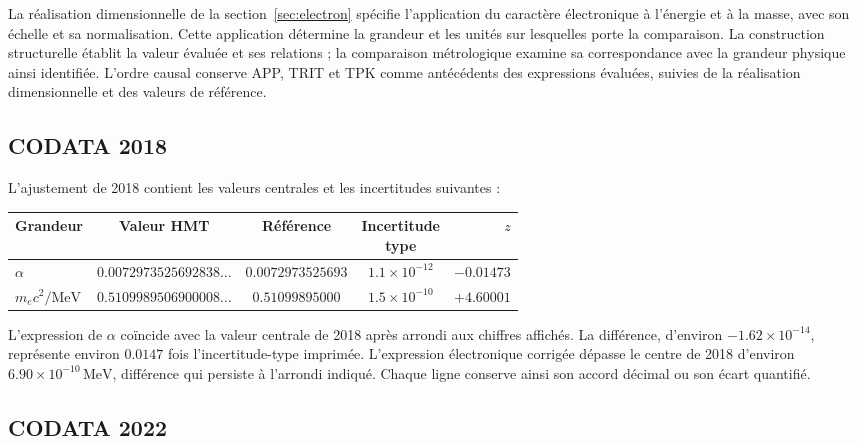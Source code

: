La réalisation dimensionnelle de la section~\ref{sec:electron} spécifie l'application du caractère électronique à l'énergie et à la masse, avec son échelle et sa normalisation. Cette application détermine la grandeur et les unités sur lesquelles porte la comparaison. La construction structurelle établit la valeur évaluée et ses relations ; la comparaison métrologique examine sa correspondance avec la grandeur physique ainsi identifiée. L'ordre causal conserve APP, TRIT et TPK comme antécédents des expressions évaluées, suivies de la réalisation dimensionnelle et des valeurs de référence.

\subsection{CODATA 2018}

L'ajustement de 2018 contient les valeurs centrales et les incertitudes suivantes\cite{codata2018} :
\begin{center}
\begin{tabular}{@{}lcccr@{}}\toprule
Grandeur&Valeur HMT&Référence&\shortstack{Incertitude\\type}&\(z\)\\\midrule
\(\alpha\)&\(0.0072973525692838\ldots\)&\(0.0072973525693\)&\(1.1\times10^{-12}\)&\(-0.01473\)\\
\(m_ec^2/\mathrm{MeV}\)&\(0.5109989506900008\ldots\)&\(0.51099895000\)&\(1.5\times10^{-10}\)&\(+4.60001\)\\\bottomrule
\end{tabular}
\end{center}
L'expression de \(\alpha\) coïncide avec la valeur centrale de 2018 après arrondi aux chiffres affichés. La différence, d'environ \(-1.62\times10^{-14}\), représente environ \(0.0147\) fois l'incertitude-type imprimée. L'expression électronique corrigée dépasse le centre de 2018 d'environ \(6.90\times10^{-10}\,\mathrm{MeV}\), différence qui persiste à l'arrondi indiqué. Chaque ligne conserve ainsi son accord décimal ou son écart quantifié.



\subsection{CODATA 2022}

